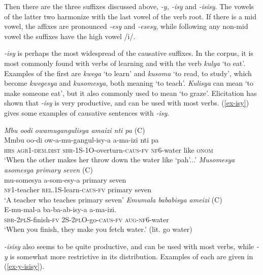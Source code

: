 \documentclass[output=paper,colorlinks,citecolor=brown,draftmode]{langscibook}
\begin{document}
Then there are the three suffixes discussed above, \emph{-y, -isy} and \emph{-isisy}. The vowels of the latter two harmonize with the last vowel of the verb root. If there is a mid vowel, the affixes are pronounced \emph{-esy} and \emph{-esesy}, while following any non-mid vowel the suffixes have the high vowel /i/. 

\emph{-isy} is perhaps the most widespread of the causative suffixes. In the corpus, it is most commonly found with verbs of learning and with the verb \emph{kulya} `to eat'. Examples of the first are \emph{kwega} `to learn' and \emph{kusoma} `to read, to study', which become \emph{kwegesya} and \emph{kusomesya}, both meaning `to teach'. \emph{Kulisya} can mean `to make someone eat', but it also commonly used to mean `to graze'. Elicitation has shown that \emph{-isy} is very productive, and can be used with most verbs. (\ref{ex-isy}) gives some examples of causative sentences with \emph{-isy}.

\ea
\begin{xlist}   \label{ex-isy}
 \ex \emph{Mbu oodi owamugangulisya amaizi nti pa} (C) \\
  \gll  Mmbu oo-di ow-a-mu-gangul-isy-a a-ma-izi nti pa\\ 
\textsc{hrs} \textsc{agr1}-\textsc{dem.dist} \textsc{sbr}-1S-1O-overturn-\textsc{caus}-\textsc{fv} \textsc{nf6}-water like \textsc{onom}\\
    \glt  `When the other makes her throw down the water like `pah'...' 
      \ex \emph{Musomesya asomesya primary seven
} (C)\\
  \gll  mu-somesya a-som-esy-a primary seven \\ 
\textsc{nf1}-teacher \textsc{rel.}1S-learn-\textsc{caus}-\textsc{fv} primary seven \\
    \glt  `A teacher who teaches primary seven' 
 \ex \emph{Emumala bababisya ameizi} (C) \\
  \gll  E-mu-mal-a ba-ba-ab-isy-a a-ma-izi. \\ 
\textsc{sbr}-\textsc{2pl}S-finish-\textsc{fv} 2S-2\textsc{pl}O-go-\textsc{caus}-\textsc{fv} \textsc{aug}-\textsc{nf6}-water \\
    \glt  `When you finish, they make you fetch water.' (lit. go water) 
    
      \end{xlist}     
      \z

\emph{-isisy} also seems to be quite productive, and can be used with most verbs, while \emph{-y} is somewhat more restrictive in its distribution. Examples of each are given in (\ref{ex-y-isisy}).
\end{document}
